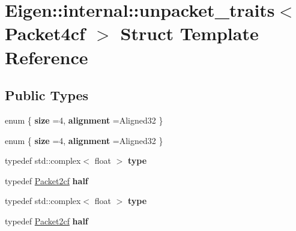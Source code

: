 \hypertarget{struct_eigen_1_1internal_1_1unpacket__traits_3_01_packet4cf_01_4}{}\section{Eigen\+:\+:internal\+:\+:unpacket\+\_\+traits$<$ Packet4cf $>$ Struct Template Reference}
\label{struct_eigen_1_1internal_1_1unpacket__traits_3_01_packet4cf_01_4}
\subsection*{Public Types}
\begin{DoxyCompactItemize}
\item 
\mbox{\label{struct_eigen_1_1internal_1_1unpacket__traits_3_01_packet4cf_01_4_a116e58f3103ec187783f5d2aab04335c}} 
enum \{ {\bfseries size} =4, 
{\bfseries alignment} =Aligned32
 \}
\item 
\mbox{\label{struct_eigen_1_1internal_1_1unpacket__traits_3_01_packet4cf_01_4_a586c060e0828c71592ed9679476cd08d}} 
enum \{ {\bfseries size} =4, 
{\bfseries alignment} =Aligned32
 \}
\item 
\mbox{\label{struct_eigen_1_1internal_1_1unpacket__traits_3_01_packet4cf_01_4_a773efaaaefd66fb0ec4e7c373a0bfbfa}} 
typedef std\+::complex$<$ float $>$ {\bfseries type}
\item 
\mbox{\label{struct_eigen_1_1internal_1_1unpacket__traits_3_01_packet4cf_01_4_a9a499a2f3adbbc1c38bbed310c0ca59b}} 
typedef \hyperlink{struct_eigen_1_1internal_1_1_packet2cf}{Packet2cf} {\bfseries half}
\item 
\mbox{\label{struct_eigen_1_1internal_1_1unpacket__traits_3_01_packet4cf_01_4_a773efaaaefd66fb0ec4e7c373a0bfbfa}} 
typedef std\+::complex$<$ float $>$ {\bfseries type}
\item 
\mbox{\label{struct_eigen_1_1internal_1_1unpacket__traits_3_01_packet4cf_01_4_a9a499a2f3adbbc1c38bbed310c0ca59b}} 
typedef \hyperlink{struct_eigen_1_1internal_1_1_packet2cf}{Packet2cf} {\bfseries half}
\end{DoxyCompactItemize}


